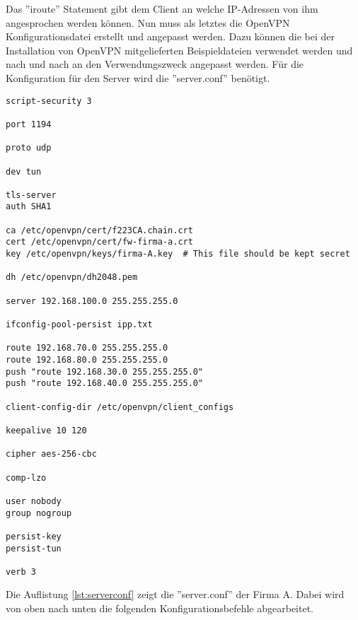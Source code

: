 \vspace{\baselineskip}
Das ''iroute'' Statement gibt dem Client an welche IP-Adressen von ihm angesprochen werden können. \newline Nun muss als letztes die OpenVPN Konfigurationsdatei erstellt und angepasst werden. Dazu können die bei der Installation von OpenVPN mitgelieferten Beispieldateien verwendet werden und nach und nach an den Verwendungszweck angepasst werden. Für die Konfiguration für den Server wird die ''server.conf'' benötigt.\newline
\lstset{
	basicstyle=\footnotesize, frame=tb,
	xleftmargin=.2\textwidth, xrightmargin=.2\textwidth
}
\begin{lstlisting}[caption={Server.conf Datei der Firma A},label=lst:serverconf]
script-security 3

port 1194

proto udp

dev tun

tls-server
auth SHA1

ca /etc/openvpn/cert/f223CA.chain.crt
cert /etc/openvpn/cert/fw-firma-a.crt
key /etc/openvpn/keys/firma-A.key  # This file should be kept secret

dh /etc/openvpn/dh2048.pem

server 192.168.100.0 255.255.255.0

ifconfig-pool-persist ipp.txt

route 192.168.70.0 255.255.255.0
route 192.168.80.0 255.255.255.0
push "route 192.168.30.0 255.255.255.0"
push "route 192.168.40.0 255.255.255.0"

client-config-dir /etc/openvpn/client_configs

keepalive 10 120

cipher aes-256-cbc

comp-lzo

user nobody	
group nogroup

persist-key
persist-tun

verb 3

\end{lstlisting}
\vspace{\baselineskip}
Die Auflistung \ref{lst:serverconf} zeigt die ''server.conf'' der Firma A. Dabei wird von oben nach unten die folgenden Konfigurationsbefehle abgearbeitet.
